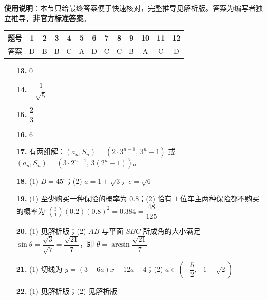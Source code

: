 
\begin{gknotice}
\textbf{使用说明}：本节只给最终答案便于快速核对，完整推导见解析版。答案为编写者独立推导，\textbf{非官方标准答案}。
\end{gknotice}

\begin{center}\begin{tabular}{ccccccccccccc}
\toprule
题号 & 1 & 2 & 3 & 4 & 5 & 6 & 7 & 8 & 9 & 10 & 11 & 12 \\
\midrule
答案 & D & B & B & C & A & D & C & C & B & A & C & D \\
\bottomrule
\end{tabular}\end{center}

\begin{itemize}[leftmargin=2.6em]
  \item[\textbf{13.}] $0$
  \item[\textbf{14.}] $-\dfrac1{\sqrt5}$
  \item[\textbf{15.}] $\dfrac23$
  \item[\textbf{16.}] $6$
\end{itemize}

\begin{itemize}[leftmargin=2.6em]
  \item[\textbf{17.}] 有两组解：$(a_n,S_n)=\left(2\cdot3^{n-1},\,3^n-1\right)$ 或 $(a_n,S_n)=\left(3\cdot2^{n-1},\,3(2^n-1)\right)$。
  \item[\textbf{18.}] (1) $B=45^\circ$；(2) $a=1+\sqrt3$，$c=\sqrt6$
  \item[\textbf{19.}] (1) 至少购买一种保险的概率为 $0.8$；(2) 恰有 $1$ 位车主两种保险都不购买的概率为 $\binom31(0.2)(0.8)^2=0.384=\dfrac{48}{125}$
  \item[\textbf{20.}] (1) 见解析版；(2) $AB$ 与平面 $SBC$ 所成角的大小满足 $\sin\theta=\dfrac{\sqrt3}{\sqrt7}=\dfrac{\sqrt{21}}7$，即 $\theta=\arcsin\dfrac{\sqrt{21}}7$
  \item[\textbf{21.}] (1) 切线为 $y=(3-6a)x+12a-4$；(2) $a\in\left(-\dfrac52,-1-\sqrt2\right)$
  \item[\textbf{22.}] (1) 见解析版；(2) 见解析版
\end{itemize}
